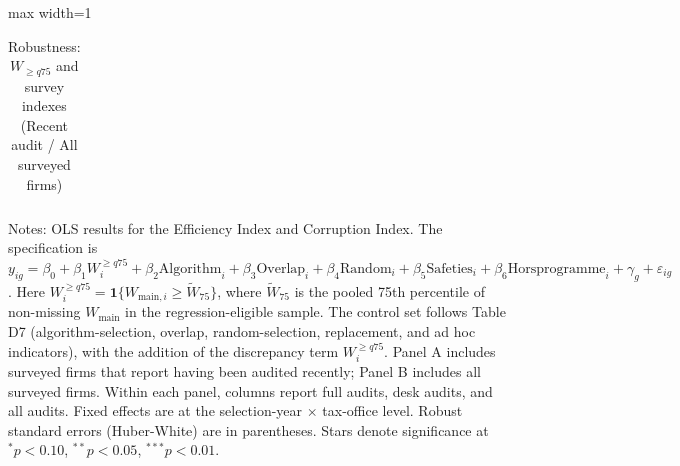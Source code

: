 \documentclass{article}
\newcommand{\OutPath}{Output/}%
\newcommand{\OutPath}{../Output/}%
\begin{document}
\begin{table}[!htbp]
\centering
\begin{adjustbox}{max width=1\textwidth}
\begin{threeparttable}
\caption{Robustness: \(W_{\ge q75}\) and survey indexes (Recent audit / All surveyed firms)}
\begin{tabular}{l*{6}{c}}

\end{tabular}
\begin{tablenotes}[flushleft]
\footnotesize
\item Notes: OLS results for the Efficiency Index and Corruption Index. The specification is \(y_{ig}=\beta_0+\beta_1 W_i^{\ge q75}+\beta_2 \text{Algorithm}_i+\beta_3 \text{Overlap}_i+\beta_4 \text{Random}_i+\beta_5 \text{Safeties}_i+\beta_6 \text{Horsprogramme}_i+\gamma_g+\varepsilon_{ig}\). Here \(W_i^{\ge q75}=\mathbf{1}\{W_{\text{main},i}\ge\widetilde{W}_{75}\}\), where \(\widetilde{W}_{75}\) is the pooled 75th percentile of non-missing \(W_{\text{main}}\) in the regression-eligible sample. The control set follows Table D7 (algorithm-selection, overlap, random-selection, replacement, and ad hoc indicators), with the addition of the discrepancy term \(W_i^{\ge q75}\). Panel A includes surveyed firms that report having been audited recently; Panel B includes all surveyed firms. Within each panel, columns report full audits, desk audits, and all audits. Fixed effects are at the selection-year \(\times\) tax-office level. Robust standard errors (Huber-White) are in parentheses. Stars denote significance at \(^{*}p<0.10\), \(^{**}p<0.05\), \(^{***}p<0.01\).
\end{tablenotes}
\end{threeparttable}
\end{adjustbox}
\end{table}
\end{document}
